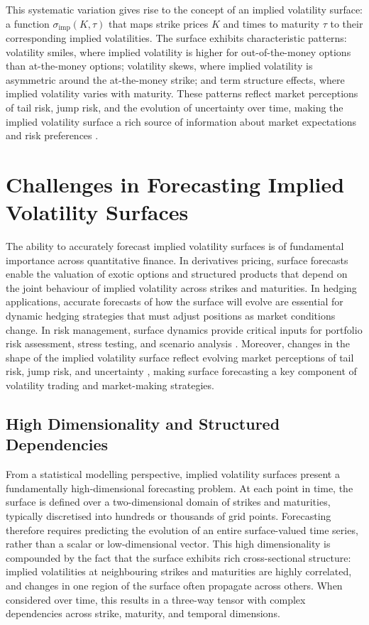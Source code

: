 This systematic variation gives rise to the concept of an implied volatility surface: a function $\sigma_{\text{imp}}(K, \tau)$ that maps strike prices $K$ and times to maturity $\tau$ to their corresponding implied volatilities. The surface exhibits characteristic patterns: volatility smiles, where implied volatility is higher for out-of-the-money options than at-the-money options; volatility skews, where implied volatility is asymmetric around the at-the-money strike; and term structure effects, where implied volatility varies with maturity. These patterns reflect market perceptions of tail risk, jump risk, and the evolution of uncertainty over time, making the implied volatility surface a rich source of information about market expectations and risk preferences \cite{Gat:06,Fen:05}.

\section{Challenges in Forecasting Implied Volatility Surfaces}

The ability to accurately forecast implied volatility surfaces is of fundamental importance across quantitative finance. In derivatives pricing, surface forecasts enable the valuation of exotic options and structured products that depend on the joint behaviour of implied volatility across strikes and maturities. In hedging applications, accurate forecasts of how the surface will evolve are essential for dynamic hedging strategies that must adjust positions as market conditions change. In risk management, surface dynamics provide critical inputs for portfolio risk assessment, stress testing, and scenario analysis \cite{Gat:06}. Moreover, changes in the shape of the implied volatility surface reflect evolving market perceptions of tail risk, jump risk, and uncertainty \cite{Fen:05,ConTan:04}, making surface forecasting a key component of volatility trading and market-making strategies.

\subsection{High Dimensionality and Structured Dependencies}

From a statistical modelling perspective, implied volatility surfaces present a fundamentally high-dimensional forecasting problem. At each point in time, the surface is defined over a two-dimensional domain of strikes and maturities, typically discretised into hundreds or thousands of grid points. Forecasting therefore requires predicting the evolution of an entire surface-valued time series, rather than a scalar or low-dimensional vector. This high dimensionality is compounded by the fact that the surface exhibits rich cross-sectional structure: implied volatilities at neighbouring strikes and maturities are highly correlated, and changes in one region of the surface often propagate across others. When considered over time, this results in a three-way tensor with complex dependencies across strike, maturity, and temporal dimensions.

